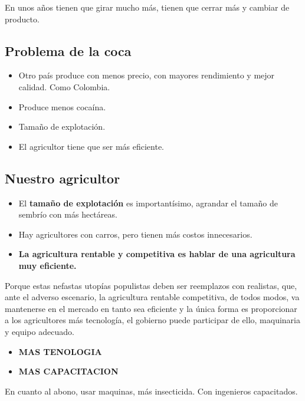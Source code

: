 \documentclass[
  letterpaper,
  DIV=11,
  numbers=noendperiod]{scrartcl}
\begin{document}
En unos años tienen que girar mucho más, tienen que cerrar más y cambiar
de producto.

\hypertarget{problema-de-la-coca}{%
\subsection{Problema de la coca}\label{problema-de-la-coca}}

\begin{itemize}
\item
  Otro país produce con menos precio, con mayores rendimiento y mejor
  calidad. Como Colombia.
\item
  Produce menos cocaína.
\item
  Tamaño de explotación.
\item
  El agricultor tiene que ser más eficiente.
\end{itemize}

\hypertarget{nuestro-agricultor}{%
\subsection{Nuestro agricultor}\label{nuestro-agricultor}}

\begin{itemize}
\item
  El \textbf{tamaño de explotación} es importantísimo, agrandar el
  tamaño de sembrío con más hectáreas.
\item
  Hay agricultores con carros, pero tienen más costos innecesarios.
\item
  \textbf{La agricultura rentable y competitiva es hablar de una
  agricultura muy eficiente.}
\end{itemize}

Porque estas nefastas utopías populistas deben ser reemplazos con
realistas, que, ante el adverso escenario, la agricultura rentable
competitiva, de todos modos, va mantenerse en el mercado en tanto sea
eficiente y la única forma es proporcionar a los agricultores más
tecnología, el gobierno puede participar de ello, maquinaria y equipo
adecuado.

\begin{itemize}
\item
  \textbf{MAS TENOLOGIA}
\item
  \textbf{MAS CAPACITACION}
\end{itemize}

En cuanto al abono, usar maquinas, más insecticida. Con ingenieros
capacitados.
\end{document}
